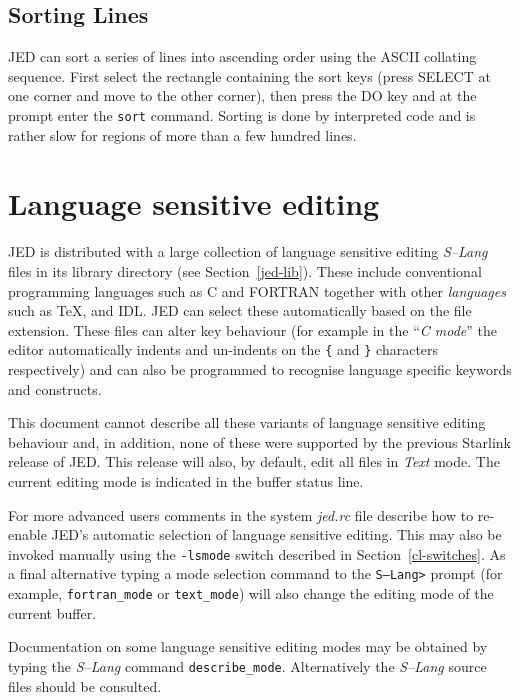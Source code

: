 \documentclass[twoside,11pt]{article}
\newcommand{\xlabel}[1]{}
\begin{document}
\subsection{Sorting Lines\xlabel{sorting_lines}}

JED can sort a series of lines into ascending order using the ASCII
collating sequence.  First select the rectangle containing the sort keys
(press SELECT at one corner and move to the other corner), then press the
DO key and at the prompt enter the \texttt{sort} command. Sorting is done by
interpreted code and is rather slow for regions of more than a few
hundred lines.

\section{\xlabel{language_sensitive_editing}Language sensitive editing}
\label{language_sensitive_editing}

JED is distributed with a large collection of language sensitive editing 
\textit{S--Lang} files in its library directory (see
Section~{\ref{jed-lib}}). These include conventional programming
languages such as C and FORTRAN together with other \textit{languages}
such as \TeX, and IDL\@. JED can select these automatically based on the
file extension. These files can alter key behaviour (for example in
the ``\textit{C mode}'' the editor automatically indents and
un-indents on the \verb+{+ and \verb+}+ characters respectively)
and can also be programmed to recognise language specific keywords and
constructs.

This document cannot describe all these variants of language sensitive
editing behaviour and, in addition, none of these were supported by the
previous Starlink release of JED\@. This release will also, by default,
edit all files in \textit{Text} mode. The current editing mode is
indicated in the buffer status line.

For more advanced users comments in the system \textit{jed.rc} file describe 
how to re-enable JED's automatic selection of language sensitive editing. 
This may also be invoked manually
using the \texttt{-lsmode} switch described
in Section~{\ref{cl-switches}}. As a final alternative typing a mode 
selection command to the \texttt{S--Lang>}
prompt (for example, \texttt{fortran\_mode} or \texttt{text\_mode}) will also 
change the editing mode of the current buffer.

Documentation on some language sensitive editing modes may be obtained by
typing the \textit{S--Lang} command \texttt{describe\_mode}.
Alternatively the \textit{S--Lang} source files should be consulted.
\newpage
\end{document}
